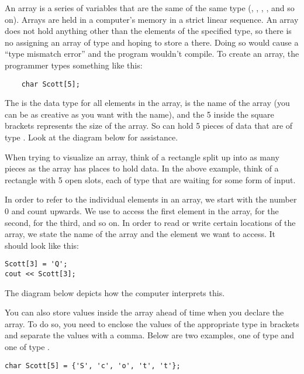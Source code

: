 An array is a series of variables that are the same of the same type (, , , , and so on).
Arrays are held in a computer's memory in a strict linear sequence.
An array does not hold anything other than the elements of the specified type, so there is no assigning an array of type  and hoping to store a  there. 
Doing so would cause a ``type mismatch error'' and the program wouldn't compile. 
To create an array, the programmer types something like this:

\begin{lstlisting}
	char Scott[5];
\end{lstlisting}

The  is the data type for all elements in the array,  is the name of the array (you can be as creative as you want with the name), and the 5 inside the square brackets represents the size of the array. 
So  can hold 5 pieces of data that are of type . 
Look at the diagram below for assistance.


When trying to visualize an array, think of a rectangle split up into as many pieces as the array has places to hold data.
In the above example, think of a rectangle with 5 open slots, each of type  that are waiting for some form of input. 

In order to refer to the individual elements in an array, we start with the number 0 and count upwards. 
We use \Code{[0]} to access the first element in the array, \Code{[1]} for the second, \Code{[2]} for the third, and so on. 
In order to read or write certain locations of the array, we state the name of the array and the element we want to access. 
It should look like this:

\begin{lstlisting}
Scott[3] = 'Q';
cout << Scott[3];
\end{lstlisting}

The diagram below depicts how the computer interprets this.


You can also store values inside the array ahead of time when you declare the array. 
To do so, you need to enclose the values of the appropriate type in brackets and separate the values with a comma. 
Below are two examples, one of type  and one of type .

\begin{lstlisting}
char Scott[5] = {'S', 'c', 'o', 't', 't'};	
\end{lstlisting}

